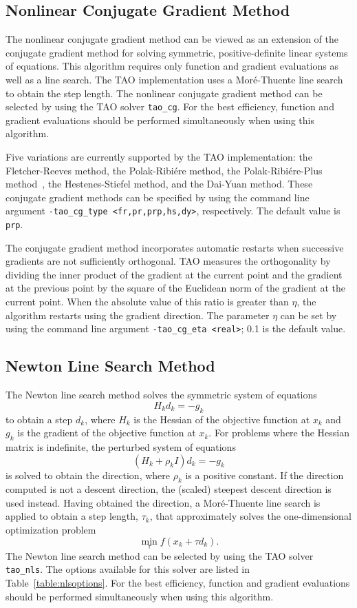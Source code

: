 \subsection{Nonlinear Conjugate Gradient Method}

The nonlinear conjugate gradient method can be viewed as an extension of the 
conjugate gradient method for solving symmetric, positive-definite linear 
systems of equations.  This algorithm requires only function and gradient 
evaluations as well as a line search.  The TAO implementation uses a 
Mor\'{e}-Thuente line search to obtain the step length.  The nonlinear 
conjugate gradient method can be selected by using the TAO solver 
{\tt tao\_cg}.  For the best efficiency, function and gradient evaluations 
should be performed simultaneously when using this algorithm.

Five variations are currently supported by the TAO implementation: the 
Fletcher-Reeves method, the Polak-Ribi\'ere method, the Polak-Ribi\'ere-Plus 
method~\cite{NW99}, the Hestenes-Stiefel method, and the Dai-Yuan method.  
These conjugate gradient methods can be specified by using the command line 
argument {\tt -tao\_cg\_type <fr,pr,prp,hs,dy>}, respectively.  The default 
value is {\tt prp}.  

The conjugate gradient method incorporates automatic restarts when successive 
gradients are not sufficiently orthogonal.  TAO measures the orthogonality by 
dividing the inner product of the gradient at the current point and the 
gradient at the previous point by the square of the Euclidean norm of 
the gradient at the current point.  When the absolute value of this 
ratio is greater than $\eta$, the algorithm restarts using the gradient 
direction.  The parameter $\eta$ can be set by using the command line argument 
{\tt -tao\_cg\_eta <real>}; 0.1 is the default value.  

\subsection{Newton Line Search Method}

The Newton line search method solves the symmetric system of equations
\[
H_k d_k = -g_k
\]
to obtain a step $d_k$, where $H_k$ is the Hessian of the objective function
at $x_k$ and $g_k$ is the gradient of the objective function at $x_k$.
For problems where the Hessian matrix is indefinite, the perturbed system
of equations
\[
(H_k + \rho_k I) d_k = -g_k
\]
is solved to obtain the direction, where $\rho_k$ is a positive constant.
If the direction computed is not a descent direction, the (scaled) steepest 
descent direction is used instead.  Having obtained the direction, 
a Mor\'{e}-Thuente line search is applied to obtain a step length, 
$\tau_k$, that approximately solves the one-dimensional optimization 
problem
\[
\min_\tau f(x_k + \tau d_k).
\]
The Newton line search method can be selected by using the TAO 
solver {\tt tao\_nls}.
The options available for this solver are listed in
Table~\ref{table:nlsoptions}.
For the best efficiency, function and gradient evaluations should be 
performed simultaneously when using this algorithm.

